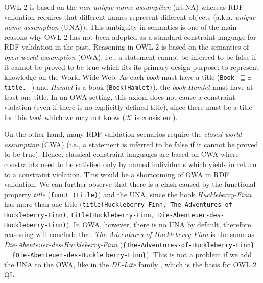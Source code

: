 \documentclass{llncs}
\newcommand{\ms}[1]{\texttt{#1}}
\newcommand{\tb}[1]{\todo[size=\small, color=green!40]{\textbf{Thomas:} #1}}
\begin{document}
OWL 2 is based on the {\em non-unique name assumption} (nUNA) whereas RDF validation requires that different names represent different objects (a.k.a. {\em unique name assumption} (UNA)). 
This ambiguity in semantics is one of the main reasons why OWL 2 has not been adopted as a standard constraint language for RDF validation in the past.  
Reasoning in OWL 2 is based on the semantics of {\em open-world assumption} (OWA), i.e., a statement cannot be inferred to be false if it cannot be proved to be true  which fits its primary design purpose: to represent knowledge on the World Wide Web. 
As each \emph{book} must have a title (\ms{Book $\sqsubseteq \exists$ title.$\top$}) and {\em Hamlet} is a book (\ms{Book(Hamlet)}),
the \emph{book} {\em Hamlet} must have at least one title.
In an OWA setting, this axiom does not cause a constraint violation (even if there is no explicitly defined title), since there must be a title for this \emph{book} which we may not know ($\mathcal{K}$ is consistent). 

On the other hand, many RDF validation scenarios require the {\em closed-world assumption} (CWA) (i.e., a statement is inferred to be false if it cannot be proved to be true).
Hence, classical constraint languages are based on CWA where constraints need to be satisfied only by named individuals which yields in return to a constraint violation. This would be a shortcoming of OWA in RDF validation. 
We can further observe that there is a clash caused by the functional property {\em title} (\ms{funct (title)}) and the UNA,
since the book {\em Huckleberry-Finn} has more than one title
(\ms{title(Huckleberry-Finn, The-Adventures-of-Huckleberry-Finn)}, \ms{title(Huckleberry-Finn, Die-Abenteuer-des-Huckleberry-Finn)}).
In OWA, however, there is no UNA by default, therefore reasoning will conclude that {\em The-Adventures-of-Huckleberry-Finn} is the same as {\em Die-Abenteuer-des-Huckleberry-Finn} (\ms{\{The-Adventures-of-Huckleberry-Finn\}} = \ms{\{Die-Abenteuer-des-Huckle} \ms{berry-}\ms{Finn\}}). 
This is not a problem if we add the UNA to the OWA, like in the \textit{DL-Lite} family \cite{Calvanese2007,Artale2009}, which is the basis for OWL 2 QL. 
\end{document}
